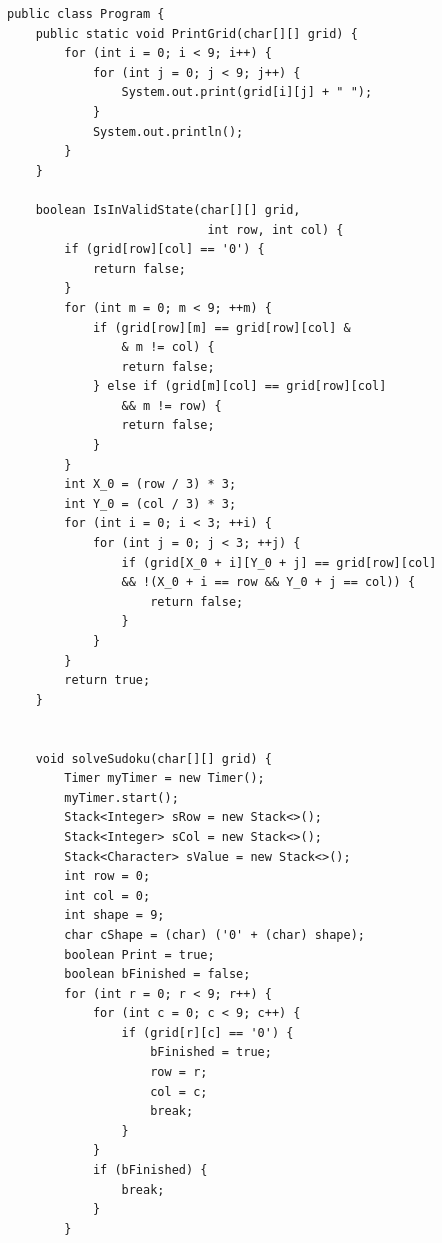 \documentclass[11pt]{article}
\begin{document}
\begin{appendices}
\begin{lstlisting}
public class Program {
    public static void PrintGrid(char[][] grid) {
        for (int i = 0; i < 9; i++) {
            for (int j = 0; j < 9; j++) {
                System.out.print(grid[i][j] + " ");
            }
            System.out.println();
        }
    }

    boolean IsInValidState(char[][] grid, 
                            int row, int col) {
        if (grid[row][col] == '0') {
            return false;
        }
        for (int m = 0; m < 9; ++m) {
            if (grid[row][m] == grid[row][col] &
                & m != col) {
                return false;
            } else if (grid[m][col] == grid[row][col] 
                && m != row) {
                return false;
            }
        }
        int X_0 = (row / 3) * 3;
        int Y_0 = (col / 3) * 3;
        for (int i = 0; i < 3; ++i) {
            for (int j = 0; j < 3; ++j) {
                if (grid[X_0 + i][Y_0 + j] == grid[row][col] 
                && !(X_0 + i == row && Y_0 + j == col)) {
                    return false;
                }
            }
        }
        return true;
    }


    void solveSudoku(char[][] grid) {
        Timer myTimer = new Timer();
        myTimer.start();
        Stack<Integer> sRow = new Stack<>();
        Stack<Integer> sCol = new Stack<>();
        Stack<Character> sValue = new Stack<>();
        int row = 0;
        int col = 0;
        int shape = 9;
        char cShape = (char) ('0' + (char) shape);
        boolean Print = true;
        boolean bFinished = false;
        for (int r = 0; r < 9; r++) {
            for (int c = 0; c < 9; c++) {
                if (grid[r][c] == '0') {
                    bFinished = true;
                    row = r;
                    col = c;
                    break;
                }
            }
            if (bFinished) {
                break;
            }
        }


\end{lstlisting}
\end{appendices}
\end{document}
